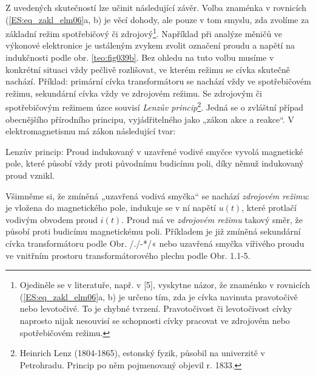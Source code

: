 
    Z uvedených skutečností lze učinit následující závěr. Volba znaménka v rovnicích
    (\ref{ES:eq_zakl_elm06}a, b) je věcí dohody, ale pouze v tom smyslu, zda zvolíme za základní
    režim spotřebičový či zdrojový\footnote{Ojediněle se v literatuře, např. v [5], vyskytne názor,
    že znaménko v rovnicích (\ref{ES:eq_zakl_elm06}a, b) je určeno tím, zda je cívka navinuta
    pravotočivě nebo levotočivé. To je chybné tvrzení. Pravotočivost či levotočivost cívky naprosto
    nijak nesouvisí se schopnosti cívky pracovat ve zdrojovém nebo spotřebičovém režimu.}. 
    Například při analýze měničů ve výkonové elektronice je ustáleným zvykem zvolit označení proudu
    a napětí na indukčnosti podle obr. \ref{teo:fig039b}. Bez ohledu na tuto volbu musíme v 
    konkrétní situaci vždy pečlivě rozlišovat, ve kterém režimu se cívka skutečně nachází.
    Příklad: primární cívka transformátoru se nachází vždy ve spotřebičovém režimu, sekundární
    cívka vždy ve zdrojovém režimu. Se zdrojovým či spotřebičovým režimem úzce souvisí \emph{Lenzův
    princip}\footnote{Heinrich Lenz (1804-1865), estonský fyzik, působil na univerzitě v
    Petrohradu. Princip po něm pojmenovaný objevil r. 1833.}. Jedná se o zvláštní případ
    obecnějšího přírodního principu, vyjádřitelného jako „zákon akce a reakce“. V elektromagnetismu
    má zákon následující tvar:

    Lenzův princip: Proud indukovaný v uzavřené vodivé smyčce vyvolá magnetické pole, které působí
    vždy proti původnímu budicímu poli, díky němuž indukovaný proud vznikl.

    Všimněme si, že zmíněná „uzavřená vodivá smyčka“ se nachází \emph{zdrojovém režimu}: je vložena
    do magnetického pole, indukuje se v ní napětí \(u(t)\), které protlačí vodivým obvodem proud
    \(i(t)\). Proud má ve \emph{zdrojovém režimu} takový směr, že působí proti budicímu magnetickému
    poli. Příkladem je již zmíněná sekundární cívka transformátoru podle Obr. /./-*/« nebo uzavřená
    smyčka vířivého proudu ve vnitřním prostoru transformátorového plechu podle Obr. 1.1-5.


